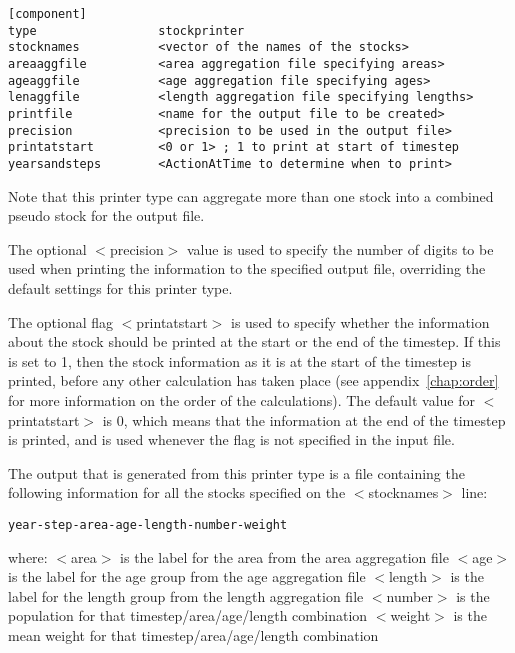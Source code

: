 \documentclass[10pt,twoside]{book}
\begin{document}
{\small\begin{verbatim}
[component]
type                 stockprinter
stocknames           <vector of the names of the stocks>
areaaggfile          <area aggregation file specifying areas>
ageaggfile           <age aggregation file specifying ages>
lenaggfile           <length aggregation file specifying lengths>
printfile            <name for the output file to be created>
precision            <precision to be used in the output file>
printatstart         <0 or 1> ; 1 to print at start of timestep
yearsandsteps        <ActionAtTime to determine when to print>
\end{verbatim}}

Note that this printer type can aggregate more than one stock into a combined pseudo stock for the output file.

\bigskip
The optional $<$precision$>$ value is used to specify the number of digits to be used when printing the information to the specified output file, overriding the default settings for this printer type.

\bigskip
The optional flag $<$printatstart$>$ is used to specify whether the information about the stock should be printed at the start or the end of the timestep.  If this is set to 1, then the stock information as it is at the start of the timestep is printed, before any other calculation has taken place (see appendix~\ref{chap:order} for more information on the order of the calculations).  The default value for $<$printatstart$>$ is 0, which means that the information at the end of the timestep is printed, and is used whenever the flag is not specified in the input file.

\bigskip
The output that is generated from this printer type is a file containing the following information for all the stocks specified on the $<$stocknames$>$ line:

{\small\begin{verbatim}
year-step-area-age-length-number-weight
\end{verbatim}}

where:\newline
$<$area$>$ is the label for the area from the area aggregation file\newline
$<$age$>$ is the label for the age group from the age aggregation file\newline
$<$length$>$ is the label for the length group from the length aggregation file\newline
$<$number$>$ is the population for that timestep/area/age/length combination\newline
$<$weight$>$ is the mean weight for that timestep/area/age/length combination
\end{document}
